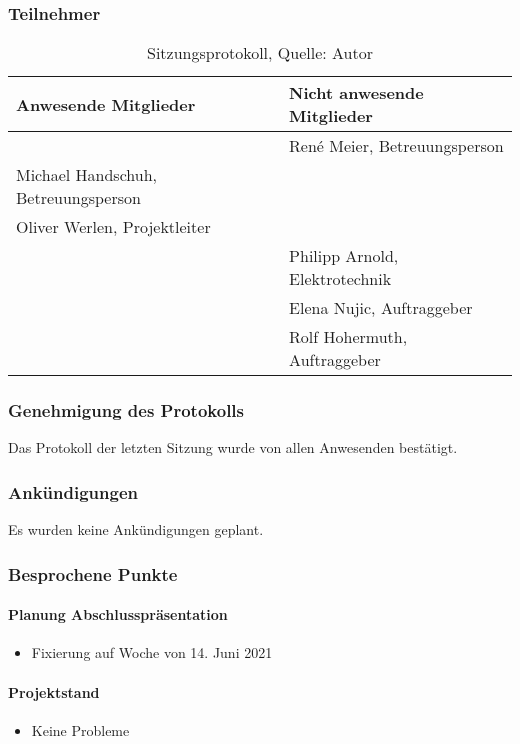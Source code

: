 \subsubsection{Teilnehmer}
\begin{table}[H]
	\setlength\extrarowheight{2pt} %
	\begin{tabularx}{\textwidth}{|X|X|}
		\hline
		\textbf{Anwesende Mitglieder} &  \textbf{Nicht anwesende Mitglieder} \\
		\hline
		& René Meier, Betreuungsperson  \\
		 Michael Handschuh, Betreuungsperson &   \\
		Oliver Werlen, Projektleiter &  \\
		& Philipp Arnold, Elektrotechnik  \\
		& Elena Nujic, Auftraggeber  \\
		& Rolf Hohermuth, Auftraggeber  \\
		\hline
	\end{tabularx}
	\caption{ \label{tbl: Teilnehmerliste vom 12.05.2021}Sitzungsprotokoll, Quelle: Autor}
\end{table}
\subsubsection{Genehmigung des Protokolls}
Das Protokoll der letzten Sitzung wurde von allen Anwesenden bestätigt.
\subsubsection{Ankündigungen}
Es wurden keine Ankündigungen geplant.
\subsubsection{Besprochene Punkte}
\paragraph{Planung Abschlusspräsentation}
\begin{itemize}
	\item Fixierung auf Woche von 14. Juni 2021
\end{itemize}
\paragraph{Projektstand}
\begin{itemize}
	\item Keine Probleme 
\end{itemize}

